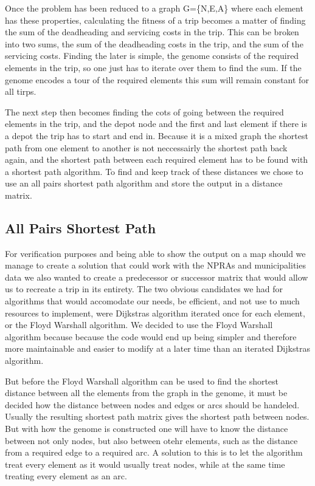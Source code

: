 Once the problem has been reduced to a graph G=\{N,E,A\} where each element has these properties, calculating the fitness of a trip becomes a matter of finding the sum of the deadheading and servicing costs in the trip. This can be broken into two sums, the sum of the deadheading costs in the trip, and the sum of the servicing costs. Finding the later is simple, the genome consists of the required elements in the trip, so one just has to iterate over them to find the sum. If the genome encodes a tour of the required elements this sum will remain constant for all tirps.

The next step then becomes finding the cots of going between the required elements in the trip, and the depot node and the first and last element if there is a depot the trip has to start and end in. Because it is a mixed graph the shortest path from one element to another is not neccessairly the shortest path back again, and the shortest path between each required element has to be found with a shortest path algorithm. To find and keep track of these distances we chose to use an all pairs shortest path algorithm and store the output in a distance matrix.


\subsection{All Pairs Shortest Path} %
\label{sub:all_pairs_shortest_path}

For verification purposes and being able to show the output on a map should we manage to create a solution that could work with the NPRAs and municipalities data we also wanted to create a predecessor or successor matrix that would allow us to recreate a trip in its entirety. The two obvious candidates we had for algorithms that would accomodate our needs, be efficient, and not use to much resources to implement, were Dijkstras algorithm iterated once for each element, or the Floyd Warshall algorithm. We decided to use the Floyd Warshall algorithm because because the code would end up being simpler and therefore more maintainable and easier to modify at a later time than an iterated Dijkstras algorithm.

But before the Floyd Warshall algorithm can be used to find the shortest distance between all the elements from the graph in the genome, it must be decided how the distance between nodes and edges or arcs should be handeled. Usually the resulting shortest path matrix gives the shortest path between nodes. But with how the genome is constructed one will have to know the distance between not only nodes, but also between otehr elements, such as the distance from a required edge to a required arc. A solution to this is to let the algorithm treat every element as it would usually treat nodes, while at the same time treating every element as an arc.

